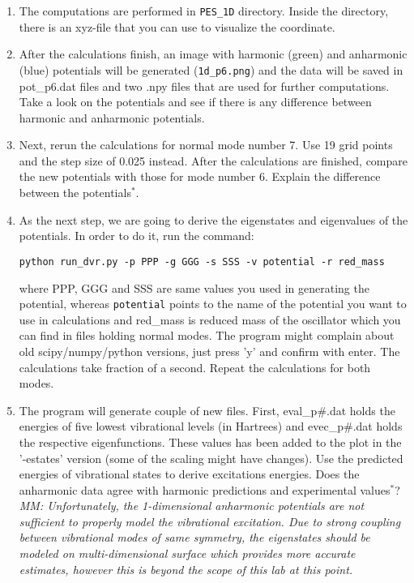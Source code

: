 \documentclass{tufte-handout}
\begin{document}
\begin{enumerate}
 {\tt python create\_PES\_2d.py --help} 
 
 The computations will take approximately 15 minutes. The progress should be shown on the screen. 
 
 \item The computations are performed in {\tt PES\_1D} directory. Inside the directory, there is an xyz-file that you can use to visualize the coordinate. 
 
 \item After the calculations finish, an image with harmonic (green) and anharmonic (blue) potentials will be generated ({\tt 1d\_p6.png}) and the data will be saved in pot\_p6.dat files and two .npy files that are used for further computations. Take a look on the potentials and see if there is any difference between harmonic and anharmonic potentials.
 
 \item Next, rerun the calculations for normal mode number 7. Use 19 grid points and the step size of 0.025 instead. After the calculations are finished, compare the new potentials with those for mode number 6. Explain the difference between the potentials$^*$.
 
 \item As the next step, we are going to derive the eigenstates and eigenvalues of the potentials. In order to do it, run the command: 
 
 {\tt python run\_dvr.py -p PPP -g GGG -s SSS -v potential -r red\_mass}
 
 where PPP, GGG and SSS are same values you used in generating the potential, whereas {\tt potential} points to the name of the potential you want to use in calculations and red\_mass is reduced mass of the oscillator which you can find in files holding normal modes. The program might complain about old scipy/numpy/python versions, just press 'y' and confirm with enter. The calculations take fraction of a second. Repeat the calculations for both modes. 
 
 \item The program will generate couple of new files. First, eval\_p\#.dat holds the energies of five lowest vibrational levels (in Hartrees) and evec\_p\#.dat holds the respective eigenfunctions. These values has been added to the plot in the '-estates' version (some of the scaling might have changes). Use the predicted energies of vibrational states to derive excitations energies. Does the anharmonic data agree with harmonic predictions and experimental values$^*$? 
 {\it MM: Unfortunately, the 1-dimensional anharmonic potentials are not sufficient to properly model the vibrational excitation. Due to strong coupling between vibrational modes of same symmetry, the eigenstates should be modeled on multi-dimensional surface which provides more accurate estimates, however this is beyond the scope of this lab at this point.}
 

\end{enumerate}
\end{document}
